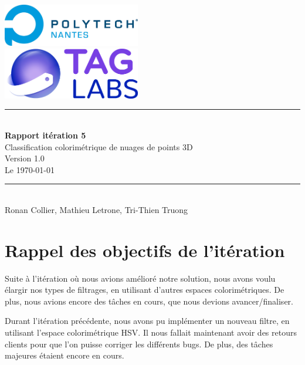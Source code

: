 \documentclass[12pt,titlepage,french]{article}
\begin{document}

\begin{titlepage}
\newcommand{\HRule}{\rule{\linewidth}{0.5mm}}
\center

  \includegraphics[width=0.45\textwidth]{../../ressources/img_logos/logo_polytech.png}\\[1cm]

  \includegraphics[width=0.45\textwidth]{../../ressources/img_logos/logo_taglabs.png}


\HRule \\[0.4cm]
{ \huge \bfseries Rapport itération 5\\[0.15cm] }
Classification colorimétrique de nuages de points 3D\\
Version 1.0\\
Le \today \\
\HRule \\[1.5cm]
Ronan Collier,
Mathieu Letrone,
Tri-Thien Truong
\\[1cm]
\end{titlepage}

\tableofcontents %
\newpage
\listoffigures  %
\newpage

\section{Rappel des objectifs de l'itération}
Suite à l'itération où nous avions amélioré notre solution, nous avons voulu élargir nos types de filtrages, en utilisant d'autres espaces colorimétriques. De plus, nous avions encore des tâches en cours, que nous devions avancer/finaliser.

Durant l'itération précédente, nous avons pu implémenter un nouveau filtre, en utilisant l'espace colorimétrique HSV. Il nous fallait maintenant avoir des retours clients pour que l'on puisse corriger les différents bugs. De plus, des tâches majeures étaient encore en cours.
\end{document}
